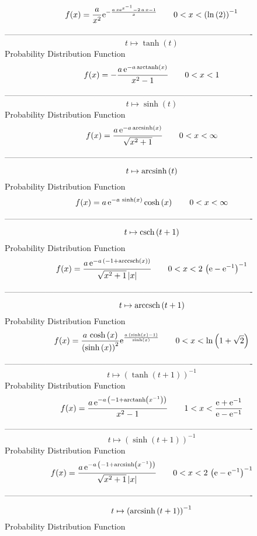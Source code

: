 \documentclass[12pt]{article}
\begin{document}
$$  f(x)={\frac {a}{{x}^{2}}{{\rm e}^{-{\frac {a\,x{{\rm e}^{{x}^{-1}}}-2\,a\,x
-1}{x}}}}}
 \qquad0
 < x <  \left( \ln  \left( 2 \right)  \right) ^{-1}
$$-------------------------------------------------------------------------------------------  \\$$t\mapsto \tanh \left( t \right) 
$$Probability Distribution Function 
$$  f(x)=-{\frac {a\,{{\rm e}^{-a\,{\rm arctanh} \left(x\right)}}}{{x}^{2}-1}}
 \qquad0
 < x < 1
$$-------------------------------------------------------------------------------------------  \\$$t\mapsto \sinh \left( t \right) 
$$Probability Distribution Function 
$$  f(x)={\frac {a\,{{\rm e}^{-a\,{\rm arcsinh} \left(x\right)}}}{\sqrt {{x}^{2
}+1}}}
 \qquad0
 < x < \infty 
$$-------------------------------------------------------------------------------------------  \\$$t\mapsto {\rm arcsinh} \left(t\right)
$$Probability Distribution Function 
$$  f(x)=a\,{{\rm e}^{-a\,\sinh \left( x \right) }}\cosh \left( x \right) 
 \qquad0
 < x < \infty 
$$-------------------------------------------------------------------------------------------  \\$$t\mapsto {\rm csch} \left(t+1\right)
$$Probability Distribution Function 
$$  f(x)={\frac {a\,{{\rm e}^{-a\, \left( -1+{\rm arccsch} \left(x\right)
 \right) }}}{\sqrt {{x}^{2}+1} \left| x \right| }}
 \qquad0
 < x < 2\, \left( {\rm e}-{{\rm e}^{-1}} \right) ^{-1}
$$-------------------------------------------------------------------------------------------  \\$$t\mapsto {\rm arccsch} \left(t+1\right)
$$Probability Distribution Function 
$$  f(x)={\frac {a\,\cosh \left( x \right) }{ \left( \sinh \left( x \right) 
 \right) ^{2}}{{\rm e}^{{\frac {a\, \left( \sinh \left( x \right) -1
 \right) }{\sinh \left( x \right) }}}}}
 \qquad0
 < x < \ln  \left( 1+\sqrt {2} \right) 
$$-------------------------------------------------------------------------------------------  \\$$t\mapsto  \left( \tanh \left( t+1 \right)  \right) ^{-1}
$$Probability Distribution Function 
$$  f(x)={\frac {a\,{{\rm e}^{-a\, \left( -1+{\rm arctanh} \left({x}^{-1}
\right) \right) }}}{{x}^{2}-1}}
 \qquad1
 < x < {\frac {{\rm e}+{{\rm e}^{-1}}}{{\rm e}-{{\rm e}^{-1}}}}
$$-------------------------------------------------------------------------------------------  \\$$t\mapsto  \left( \sinh \left( t+1 \right)  \right) ^{-1}
$$Probability Distribution Function 
$$  f(x)={\frac {a\,{{\rm e}^{-a\, \left( -1+{\rm arcsinh} \left({x}^{-1}
\right) \right) }}}{\sqrt {{x}^{2}+1} \left| x \right| }}
 \qquad0
 < x < 2\, \left( {\rm e}-{{\rm e}^{-1}} \right) ^{-1}
$$-------------------------------------------------------------------------------------------  \\$$t\mapsto  \left( {\rm arcsinh} \left(t+1\right) \right) ^{-1}
$$Probability Distribution Function 
\end{document}
